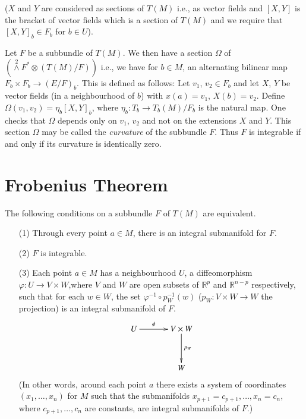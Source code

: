 ($X$ and $Y$ are considered as sections of $T(M)$ i.e., as vector fields and $[X,Y]$ is the bracket of vector fields which is a section of $T(M)$ and we require that $[X,Y]_{b}\in F_{b}$ for $b\in U$).

\begin{remark*}
Let $F$ be a subbundle of $T(M)$. We then have a section $\Omega$ of $({\displaystyle{\mathop{\wedge}\limits^{2}}}F^{*}\otimes (T(M)/F))$ i.e., we have for $b\in M$, an alternating bilinear map $F_{b}\times F_{b}\to (E/F)_{b}$. This is defined as follows: Let $v_{1}$, $v_{2}\in F_{b}$ and let $X$, $Y$ be vector fields (in a neighbourhood of $b$) with $x(a)=v_{1}$, $X(b)=v_{2}$. Define $\Omega(v_{1},v_{2})=\eta_{b}[X,Y]_{b}$, where $\eta_{b}:T_{b}\to T_{b}(M)/F_{b}$ is the natural map. One checks that $\Omega$ depends only on $v_{1}$, $v_{2}$ and not on the extensions $X$ and $Y$. This section $\Omega$ may be called the {\em curvature} of the subbundle $F$. Thus $F$ is integrable if and only if its curvature is identically zero.
\end{remark*}

\section*{Frobenius Theorem}

\begin{theorem}\label{chap8-thm8.1}
The following conditions on a subbundle $F$ of $T(M)$ are equivalent.
\begin{itemize}
\item[\rm(1)] Through every point $a\in M$, there is an integral submanifold for $F$.

\item[\rm(2)] $F$ is integrable.

\item[\rm(3)] Each point $a\in M$ has a neighbourhood $U$, a diffeomorphism $\varphi:U\to V\times W$,\pageoriginale where $V$ and $W$ are open subsets of $\mathbb{R}^{p}$ and $\mathbb{R}^{n-p}$ respectively, such that for each $w\in W$, the set $\varphi^{-1}\circ p^{-1}_{W}(w)$ ($p_{W}:V\times W\to W$ the projection) is an integral submanifold of $F$.
\[
\xymatrix@=1.2cm{
U\ar[r]^-{\phi} & V\times W\ar[d]^-{p_{W}}\\
             & W
}
\]
(In other words, around each point $a$ there exists a system of coordinates $(x_{1},\ldots,x_{n})$ for $M$ such that the submanifolds $x_{p+1}=c_{p+1},\ldots,x_{n}=c_{n}$, where $c_{p+1},\ldots,c_{n}$ are constants, are integral submanifolds of $F$.)
\end{itemize}
\end{theorem}

